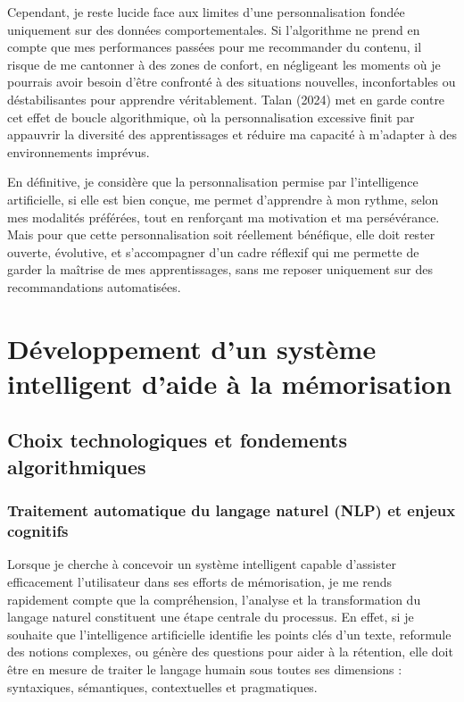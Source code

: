 \documentclass[11pt,a4paper]{report}
\begin{document}
Cependant, je reste lucide face aux limites d’une personnalisation fondée uniquement sur des données comportementales. Si l’algorithme ne prend en compte que mes performances passées pour me recommander du contenu, il risque de me cantonner à des zones de confort, en négligeant les moments où je pourrais avoir besoin d’être confronté à des situations nouvelles, inconfortables ou déstabilisantes pour apprendre véritablement. Talan (2024) met en garde contre cet effet de boucle algorithmique, où la personnalisation excessive finit par appauvrir la diversité des apprentissages et réduire ma capacité à m’adapter à des environnements imprévus.

En définitive, je considère que la personnalisation permise par l’intelligence artificielle, si elle est bien conçue, me permet d’apprendre à mon rythme, selon mes modalités préférées, tout en renforçant ma motivation et ma persévérance. Mais pour que cette personnalisation soit réellement bénéfique, elle doit rester ouverte, évolutive, et s’accompagner d’un cadre réflexif qui me permette de garder la maîtrise de mes apprentissages, sans me reposer uniquement sur des recommandations automatisées.

\chapter{Développement d’un système intelligent d’aide à la mémorisation}

\section{Choix technologiques et fondements algorithmiques}

\subsection{Traitement automatique du langage naturel (NLP) et enjeux cognitifs}

Lorsque je cherche à concevoir un système intelligent capable d’assister efficacement l’utilisateur dans ses efforts de mémorisation, je me rends rapidement compte que la compréhension, l’analyse et la transformation du langage naturel constituent une étape centrale du processus. En effet, si je souhaite que l’intelligence artificielle identifie les points clés d’un texte, reformule des notions complexes, ou génère des questions pour aider à la rétention, elle doit être en mesure de traiter le langage humain sous toutes ses dimensions : syntaxiques, sémantiques, contextuelles et pragmatiques.
\end{document}

